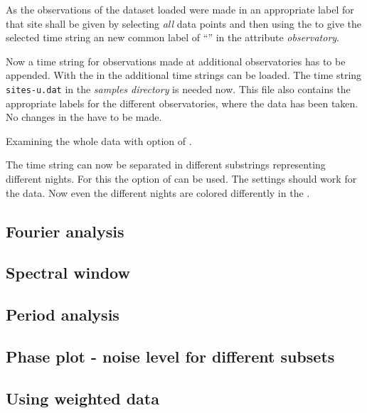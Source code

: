 As the observations of the dataset loaded were made in \toedit an appropriate
label for that site shall be given by selecting {\it all} data points and
then using the  to give the
selected time string an new common label of 
``\toedit'' in the attribute {\it observatory}.

Now a time string for observations made at additional observatories has 
to be appended. With the  in the 
 additional time strings can be loaded.
The time string {\tt sites-u.dat} in the {\it samples directory} is needed now.
This file also contains the appropriate labels for the different 
observatories, where the data has been taken. No changes in the 
 have to be made.

Examining the whole data with  option of \period.

The time string can now be separated in different substrings representing different nights.
For this the  option of \period can be used.
The settings should work for the data. Now even the different nights are colored differently
in the .

\subsection{Fourier analysis}

\subsection{Spectral window}

\subsection{Period analysis}

\subsection{Phase plot - noise level for different subsets}

\subsection{Using weighted data}


